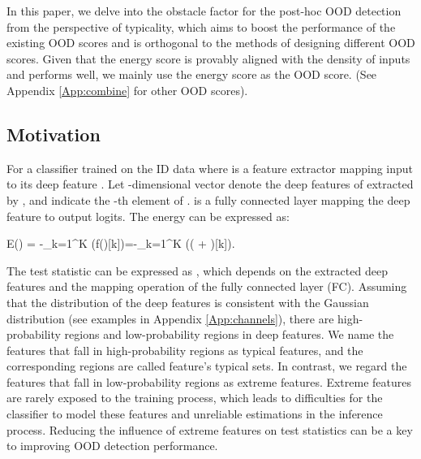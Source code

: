 \documentclass{article}
\newcommand{\benr}{}
\def\rvx{{\mathbf{x}}}
\begin{document}
In this paper, we delve into the obstacle factor for the post-hoc OOD detection from the perspective of typicality, which aims to boost the performance of the existing OOD scores and is orthogonal to the methods of designing different OOD scores. Given that the energy score \cite{liu2020energy} is {provably} aligned with the density of inputs and performs well, we mainly use the energy score as the OOD score. (See Appendix \ref{App:combine} for other OOD scores).



\subsection{Motivation}

For a classifier trained on the ID data  where  is a feature extractor mapping input  to its deep feature .
Let -dimensional vector  denote the deep features of  extracted by , and  indicate the -th element of .  is a fully connected layer mapping the deep feature  to output logits.
The energy can be expressed as:
\benr
E(\rvx) = -\log \sum_{k=1}^{K} \exp({f(\rvx)[k]})=-\log \sum_{k=1}^{K} \exp({(  \cdot {} + )[k]}).
\eenr

The test statistic can be expressed as , which depends on the extracted deep features and the mapping operation of the fully connected layer (FC). Assuming that the distribution of the deep features is consistent with the Gaussian distribution (see examples in Appendix \ref{App:channels}), there are high-probability regions and low-probability regions in deep features. We name the features that fall in high-probability regions as typical features, and the corresponding regions are called feature's typical sets. In contrast, we regard the features that fall in low-probability regions as extreme features. Extreme features are rarely exposed to the training process, which leads to difficulties for the classifier to model these features and unreliable estimations in the inference process. Reducing the influence of extreme features on test statistics can be a key to improving OOD detection performance.
\end{document}
